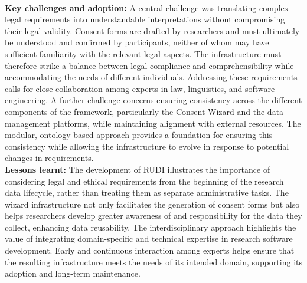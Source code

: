 \documentclass{eceasst}
\begin{document}
\\
\noindent\textbf{Key challenges and adoption:}
A central challenge was translating complex legal requirements into understandable interpretations without compromising their legal validity. Consent forms are drafted by researchers and must ultimately be understood and confirmed by participants, neither of whom may have sufficient familiarity with the relevant legal aspects. The infrastructure must therefore strike a balance between legal compliance and comprehensibility while accommodating the needs of different individuals. Addressing these requirements calls for close collaboration among experts in law, linguistics, and software engineering.
A further challenge concerns ensuring consistency across the different components of the framework, particularly the Consent Wizard and the data management platforms, while maintaining alignment with external resources. The modular, ontology-based approach provides a foundation for ensuring this consistency while allowing the infrastructure to evolve in response to potential changes in requirements.
\\
\noindent\textbf{Lessons learnt:}
The development of RUDI illustrates the importance of
considering legal and ethical requirements from the
beginning of the research data lifecycle, rather than
treating them as separate administrative tasks.
The wizard infrastructure not only facilitates the
generation of consent forms but also helps researchers
develop greater awareness of and responsibility for
the data they collect, enhancing data reusability.
The interdisciplinary approach highlights the value
of integrating domain-specific and technical expertise
in research software development.
Early and continuous interaction among experts helps
ensure that the resulting infrastructure meets the
needs of its intended domain, supporting its adoption
and long-term maintenance.
\end{document}
